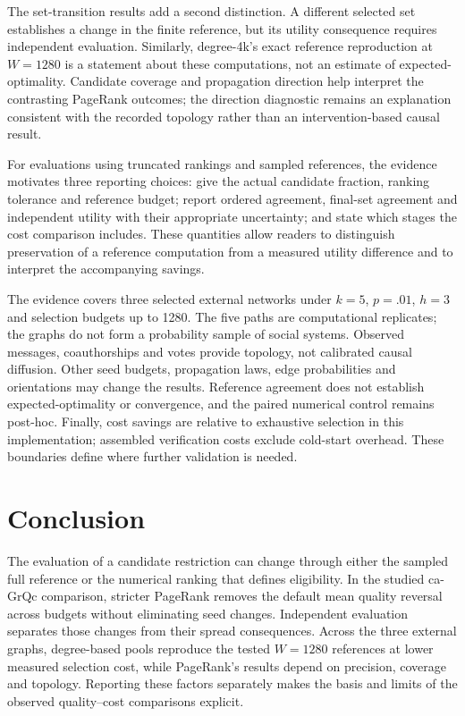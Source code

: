 \documentclass[smallextended]{svjour3}
\begin{document}
The set-transition results add a second distinction. A different selected set establishes a change in the finite reference, but its utility consequence requires independent evaluation. Similarly, degree-4k's exact reference reproduction at $W=1280$ is a statement about these computations, not an estimate of expected-optimality. Candidate coverage and propagation direction help interpret the contrasting PageRank outcomes; the direction diagnostic remains an explanation consistent with the recorded topology rather than an intervention-based causal result.

For evaluations using truncated rankings and sampled references, the evidence motivates three reporting choices: give the actual candidate fraction, ranking tolerance and reference budget; report ordered agreement, final-set agreement and independent utility with their appropriate uncertainty; and state which stages the cost comparison includes. These quantities allow readers to distinguish preservation of a reference computation from a measured utility difference and to interpret the accompanying savings.

The evidence covers three selected external networks under $k=5$, $p=.01$, $h=3$ and selection budgets up to 1280. The five paths are computational replicates; the graphs do not form a probability sample of social systems. Observed messages, coauthorships and votes provide topology, not calibrated causal diffusion. Other seed budgets, propagation laws, edge probabilities and orientations may change the results. Reference agreement does not establish expected-optimality or convergence, and the paired numerical control remains post-hoc. Finally, cost savings are relative to exhaustive selection in this implementation; assembled verification costs exclude cold-start overhead. These boundaries define where further validation is needed.

\section{Conclusion}
The evaluation of a candidate restriction can change through either the sampled full reference or the numerical ranking that defines eligibility. In the studied ca-GrQc comparison, stricter PageRank removes the default mean quality reversal across budgets without eliminating seed changes. Independent evaluation separates those changes from their spread consequences. Across the three external graphs, degree-based pools reproduce the tested $W=1280$ references at lower measured selection cost, while PageRank's results depend on precision, coverage and topology. Reporting these factors separately makes the basis and limits of the observed quality--cost comparisons explicit.
\end{document}
